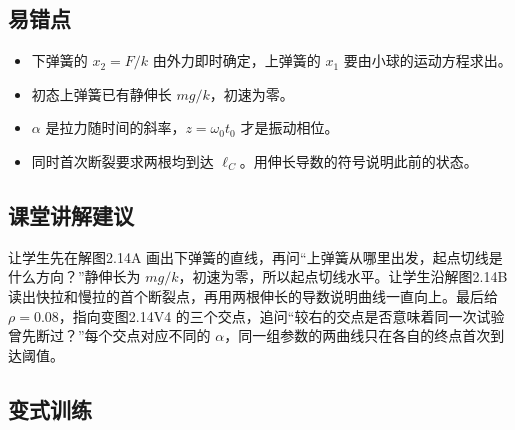 \documentclass[UTF8,fontset=fandol,a4paper,11pt]{ctexart}
\begin{document}
\subsection*{易错点}

\begin{itemize}
\item 下弹簧的 $x_2=F/k$ 由外力即时确定，上弹簧的 $x_1$ 要由小球的运动方程求出。
\item 初态上弹簧已有静伸长 $mg/k$，初速为零。
\item $\alpha$ 是拉力随时间的斜率，$z=\omega_0 t_0$ 才是振动相位。
\item 同时首次断裂要求两根均到达 $\ell_C$。用伸长导数的符号说明此前的状态。
\end{itemize}



\subsection*{课堂讲解建议}

让学生先在解图2.14A 画出下弹簧的直线，再问“上弹簧从哪里出发，起点切线是什么方向？”静伸长为 $mg/k$，初速为零，所以起点切线水平。让学生沿解图2.14B 读出快拉和慢拉的首个断裂点，再用两根伸长的导数说明曲线一直向上。最后给 $\rho=0.08$，指向变图2.14V4 的三个交点，追问“较右的交点是否意味着同一次试验曾先断过？”每个交点对应不同的 $\alpha$，同一组参数的两曲线只在各自的终点首次到达阈值。



\subsection*{变式训练}
\end{document}
